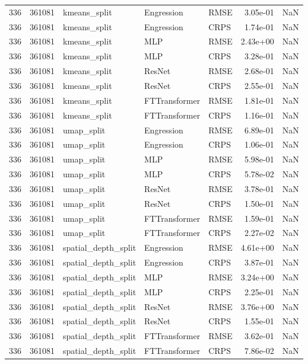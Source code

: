 \begin{tabular}{rrlllrr}
336 & 361081 & kmeans\_split & Engression & RMSE & 3.05e-01 & NaN \\
336 & 361081 & kmeans\_split & Engression & CRPS & 1.74e-01 & NaN \\
336 & 361081 & kmeans\_split & MLP & RMSE & 2.43e+00 & NaN \\
336 & 361081 & kmeans\_split & MLP & CRPS & 3.28e-01 & NaN \\
336 & 361081 & kmeans\_split & ResNet & RMSE & 2.68e-01 & NaN \\
336 & 361081 & kmeans\_split & ResNet & CRPS & 2.55e-01 & NaN \\
336 & 361081 & kmeans\_split & FTTransformer & RMSE & 1.81e-01 & NaN \\
336 & 361081 & kmeans\_split & FTTransformer & CRPS & 1.16e-01 & NaN \\
336 & 361081 & umap\_split & Engression & RMSE & 6.89e-01 & NaN \\
336 & 361081 & umap\_split & Engression & CRPS & 1.06e-01 & NaN \\
336 & 361081 & umap\_split & MLP & RMSE & 5.98e-01 & NaN \\
336 & 361081 & umap\_split & MLP & CRPS & 5.78e-02 & NaN \\
336 & 361081 & umap\_split & ResNet & RMSE & 3.78e-01 & NaN \\
336 & 361081 & umap\_split & ResNet & CRPS & 1.50e-01 & NaN \\
336 & 361081 & umap\_split & FTTransformer & RMSE & 1.59e-01 & NaN \\
336 & 361081 & umap\_split & FTTransformer & CRPS & 2.27e-02 & NaN \\
336 & 361081 & spatial\_depth\_split & Engression & RMSE & 4.61e+00 & NaN \\
336 & 361081 & spatial\_depth\_split & Engression & CRPS & 3.87e-01 & NaN \\
336 & 361081 & spatial\_depth\_split & MLP & RMSE & 3.24e+00 & NaN \\
336 & 361081 & spatial\_depth\_split & MLP & CRPS & 2.25e-01 & NaN \\
336 & 361081 & spatial\_depth\_split & ResNet & RMSE & 3.76e+00 & NaN \\
336 & 361081 & spatial\_depth\_split & ResNet & CRPS & 1.55e-01 & NaN \\
336 & 361081 & spatial\_depth\_split & FTTransformer & RMSE & 3.62e-01 & NaN \\
336 & 361081 & spatial\_depth\_split & FTTransformer & CRPS & 7.86e-02 & NaN \\

\end{tabular}
